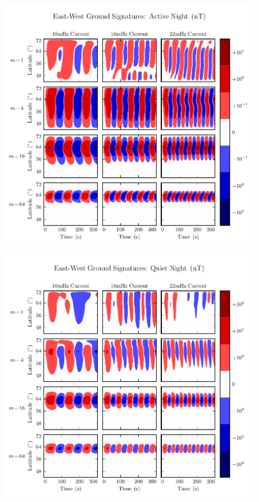 \begin{figure}[H]
    \centering
    \includegraphics[width=\textwidth]{figures/BfE_J_3.pdf}
    \caption[East-West Ground Signatures: Active Night]{}
    \label{fig_BfE_J_3}
\end{figure}

\begin{figure}[H]
    \centering
    \includegraphics[width=\textwidth]{figures/BfE_J_4.pdf}
    \caption[East-West Ground Signatures: Quiet Night]{}
    \label{fig_BfE_J_4}
\end{figure}


